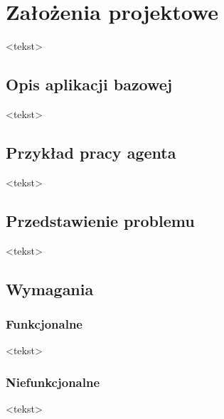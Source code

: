\chapter{Założenia projektowe}

<tekst>


\section{Opis aplikacji bazowej}

<tekst>


\section{Przykład pracy agenta}

<tekst>


\section{Przedstawienie problemu}

<tekst>


\section{Wymagania}

\subsection{Funkcjonalne}

<tekst>


\subsection{Niefunkcjonalne}

<tekst>
